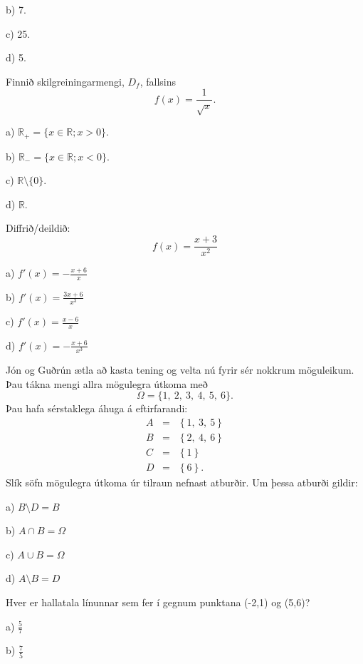 b) 7.

c) 25.

d) 5. %


\item Finnið skilgreiningarmengi, $D_f$, fallsins $$f(x) = \frac{1}{\sqrt x}.$$

a) $\mathbb{R}_+ = \{ x \in \mathbb{R} ; x>0\}$. %

b) $\mathbb{R}_- = \{ x \in \mathbb{R} ; x<0\}$.

c) $\mathbb{R} \setminus \{0\}$.

d) $\mathbb{R}$.


\item Diffrið/deildið: $$f(x)=\frac{x+3}{x^2}$$

a) \hspace{2mm} $\displaystyle f'(x)=-\frac{x+6}{x}$

b) \hspace{2mm} $\displaystyle f'(x)=\frac{3x+6}{x^3}$

c) \hspace{2mm} $\displaystyle f'(x)=\frac{x-6}{x}$

d) \hspace{2mm} $\displaystyle f'(x)=-\frac{x+6}{x^3}$ %


\item Jón og Guðrún ætla að kasta tening og velta nú fyrir sér nokkrum möguleikum. Þau tákna mengi
allra mögulegra útkoma með
$$
\Omega=\{1,\ 2,\ 3,\ 4,\ 5,\ 6\}.
$$
Þau hafa sérstaklega áhuga á eftirfarandi:
\begin{eqnarray*}
A&=&\left \{ 1,\ 3,\ 5 \right \} \\
B&=&\left \{ 2,\ 4,\ 6  \right \} \\
C&=&\left \{ 1 \right \} \\
D&=&\left \{ 6 \right \}.
\end{eqnarray*}
Slík söfn mögulegra útkoma úr tilraun nefnast atburðir. Um þessa atburði gildir:

a) $B\setminus D=B $

b) $A\cap B=\Omega$

c) $A\cup B=\Omega$ %

d) $A\setminus B=D$


\item Hver er hallatala línunnar sem fer í gegnum punktana (-2,1) og (5,6)?

a) \hspace{2mm} $\displaystyle\frac{5}{7}$ %

b) \hspace{2mm} $\displaystyle\frac{7}{5}$

